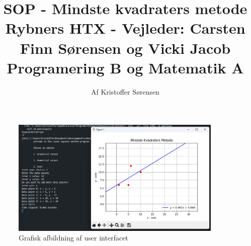 \title{
    SOP - Mindste kvadraters metode \\ 
    \large{Rybners HTX - Vejleder: Carsten Finn Sørensen og Vicki Jacob} \\
    \small{Programering B og Matematik A}
}
\author{Af Kristoffer Sørensen}
\thispagestyle{empty}
\maketitle
\begin{figure}[h!]
    \centering
    \includegraphics[width=0.9\textwidth]{figures/forsideimg.png}
    \caption{Grafisk afbildning af user interfacet}
    \label{fig:userinterface}
\end{figure}
\newpage